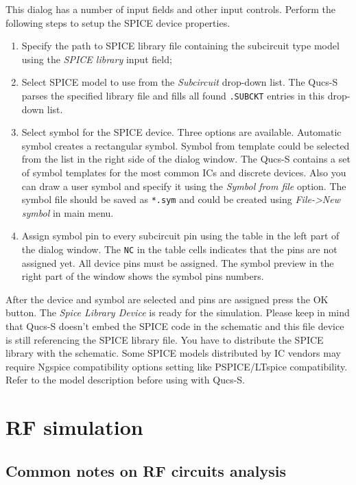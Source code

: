 \documentclass[a4paper,12pt]{article}
\begin{document}
This dialog has a number of input fields and other input controls. Perform the following steps to setup the SPICE device properties.

\begin{enumerate}
 \item Specify the path to SPICE library file containing the subcircuit type model using the \emph{SPICE library} input field;
 \item Select SPICE model to use from the \emph{Subcircuit} drop-down list. The Qucs-S parses the specified library file and fills all found \verb|.SUBCKT| entries in this drop-down list. 
 \item Select symbol for the SPICE device. Three options are available. Automatic symbol creates a rectangular symbol. Symbol from template could be selected from the list in the right side of the dialog window. The Qucs-S contains a set of symbol templates for the most common ICs and discrete devices. Also you can draw a user symbol and specify it using the \emph{Symbol from file} option. The symbol file should be saved as \verb|*.sym| and could be created using \emph{File->New symbol} in main menu.
 \item Assign symbol pin to every subcircuit pin using the table in the left part of the dialog window. The \verb|NC| in the table cells indicates that the pins are not assigned yet. All device pins must be assigned. The symbol preview in the right part of the window shows the symbol pins numbers.  
\end{enumerate}

After the device and symbol are selected and pins are assigned press the OK button. The \emph{Spice Library Device} is ready for the simulation. Please keep in mind that Qucs-S doesn't embed the SPICE code in the schematic and this file device is still referencing the SPICE library file. You have to distribute the SPICE library with the schematic. Some SPICE models distributed by IC vendors may require Ngspice compatibility options setting like PSPICE/LTspice compatibility. Refer to the model description before using with Qucs-S. 
    
\section{RF simulation}

\subsection{Common notes on RF circuits analysis}
\end{document}
